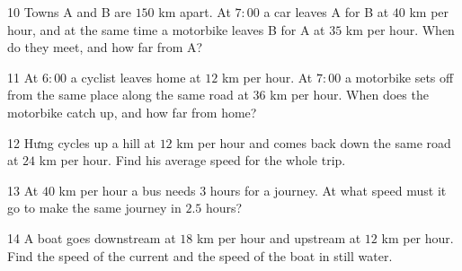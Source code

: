 \gap
\begin{probbox}{10}{\relax}
Towns A and B are $150$ km apart. At $7{:}00$ a car leaves A for B at $40$ km per hour, and at the same time a motorbike leaves B for A at $35$ km per hour. When do they meet, and how far from A?
\end{probbox}
\gap
\begin{probbox}{11}{\relax}
At $6{:}00$ a cyclist leaves home at $12$ km per hour. At $7{:}00$ a motorbike sets off from the same place along the same road at $36$ km per hour. When does the motorbike catch up, and how far from home?
\end{probbox}
\gap
\begin{probbox}{12}{}
Hưng cycles up a hill at $12$ km per hour and comes back down the same road at $24$ km per hour. Find his average speed for the whole trip.
\end{probbox}
\gap
\begin{probbox}{13}{\relax}
At $40$ km per hour a bus needs $3$ hours for a journey. At what speed must it go to make the same journey in $2.5$ hours?
\end{probbox}
\gap
\begin{probbox}{14}{\relax}
A boat goes downstream at $18$ km per hour and upstream at $12$ km per hour. Find the speed of the current and the speed of the boat in still water.
\end{probbox}
